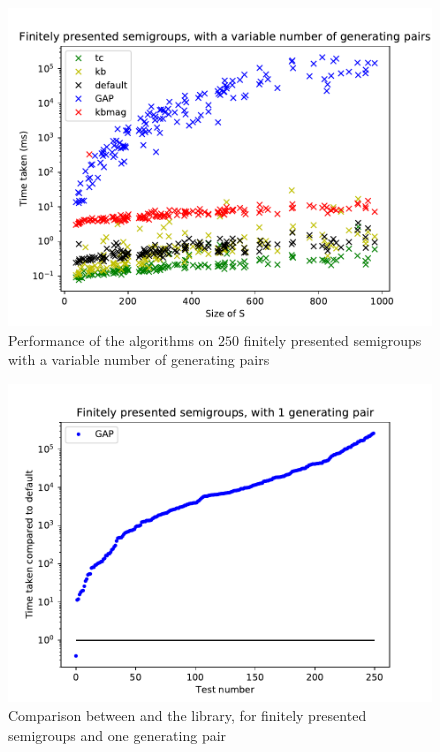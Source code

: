 \begin{figure}[p]
  \centering
  \includegraphics[width=\textwidth]{pics/ch-pairs/bench-fp-vp-times}
  \caption[Benchmark: all algorithms, finitely presented, $n$ pairs]
  {Performance of the algorithms on $250$ finitely presented semigroups
    with a variable number of generating pairs}
  \label{fig:bench-fp-vp-times}
\end{figure}

\begin{figure}[p]
  \centering
  \includegraphics[width=\textwidth]{pics/ch-pairs/bench-fp-1p-gap}
  \caption[Benchmark: \GAP{}/\libsemigroups{}, finitely presented, 1 pair]
  {Comparison between \libsemigroups{} and the \GAP{} library, for
    finitely presented semigroups and one generating pair}
  \label{fig:bench-fp-1p-gap}
\end{figure}

